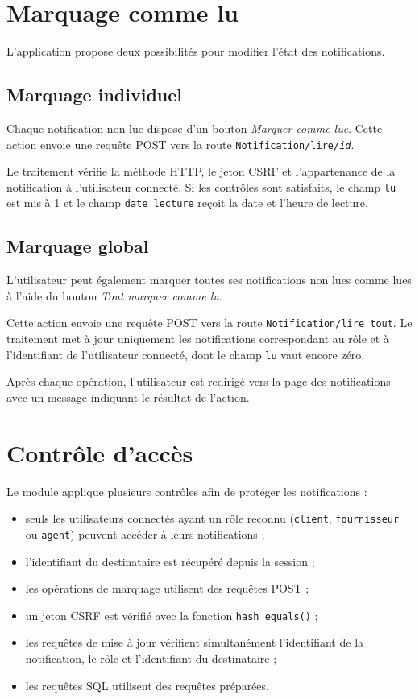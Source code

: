 \section{Marquage comme lu}

L'application propose deux possibilités pour modifier l'état des notifications.

\subsection{Marquage individuel}

Chaque notification non lue dispose d'un bouton \textit{Marquer comme lue}. Cette action envoie une requête POST vers la route \texttt{Notification/lire/\textit{id}}.

Le traitement vérifie la méthode HTTP, le jeton CSRF et l'appartenance de la notification à l'utilisateur connecté. Si les contrôles sont satisfaits, le champ \texttt{lu} est mis à 1 et le champ \texttt{date\_lecture} reçoit la date et l'heure de lecture.

\subsection{Marquage global}

L'utilisateur peut également marquer toutes ses notifications non lues comme lues à l'aide du bouton \textit{Tout marquer comme lu}.

Cette action envoie une requête POST vers la route \texttt{Notification/lire\_tout}. Le traitement met à jour uniquement les notifications correspondant au rôle et à l'identifiant de l'utilisateur connecté, dont le champ \texttt{lu} vaut encore zéro.

Après chaque opération, l'utilisateur est redirigé vers la page des notifications avec un message indiquant le résultat de l'action.

\section{Contrôle d'accès}

Le module applique plusieurs contrôles afin de protéger les notifications :

\begin{itemize}
    \item seuls les utilisateurs connectés ayant un rôle reconnu (\texttt{client}, \texttt{fournisseur} ou \texttt{agent}) peuvent accéder à leurs notifications ;
    \item l'identifiant du destinataire est récupéré depuis la session ;
    \item les opérations de marquage utilisent des requêtes POST ;
    \item un jeton CSRF est vérifié avec la fonction \texttt{hash\_equals()} ;
    \item les requêtes de mise à jour vérifient simultanément l'identifiant de la notification, le rôle et l'identifiant du destinataire ;
    \item les requêtes SQL utilisent des requêtes préparées.
\end{itemize}

